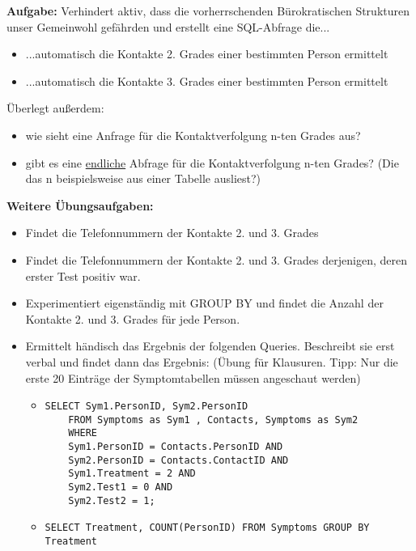 \documentclass[]{article}
\begin{document}
\textbf{Aufgabe:} Verhindert aktiv, dass die vorherrschenden Bürokratischen Strukturen unser Gemeinwohl gefährden und erstellt eine SQL-Abfrage die...
\begin{itemize}
	\item ...automatisch die Kontakte 2. Grades einer bestimmten Person ermittelt
	\item ...automatisch die Kontakte 3. Grades einer bestimmten Person ermittelt
\end{itemize}
Überlegt außerdem:
\begin{itemize}
	\item wie sieht eine Anfrage für die Kontaktverfolgung n-ten Grades aus?
	\item gibt es eine \underline{endliche} Abfrage für die Kontaktverfolgung n-ten Grades? (Die das n beispielsweise aus einer Tabelle ausliest?)
\end{itemize}

\textbf{Weitere Übungsaufgaben:}
\begin{itemize}
	\item Findet die Telefonnummern der Kontakte 2. und 3. Grades
	\item Findet die Telefonnummern der Kontakte 2. und 3. Grades derjenigen, deren erster Test positiv war. 
	\item Experimentiert eigenständig mit GROUP BY und findet die Anzahl der Kontakte 2. und 3. Grades für jede Person.
	\item Ermittelt händisch das Ergebnis der folgenden Queries. Beschreibt sie erst verbal und findet dann das Ergebnis: (Übung für Klausuren. Tipp: Nur die erste 20 Einträge der Symptomtabellen müssen angeschaut werden) \\
	\begin{itemize}\newpage
	\item  \begin{verbatim}
SELECT Sym1.PersonID, Sym2.PersonID 
	FROM Symptoms as Sym1 , Contacts, Symptoms as Sym2 
    WHERE 
    Sym1.PersonID = Contacts.PersonID AND
    Sym2.PersonID = Contacts.ContactID AND
    Sym1.Treatment = 2 AND
    Sym2.Test1 = 0 AND
    Sym2.Test2 = 1;		
		\end{verbatim}
	\item \begin{verbatim}
SELECT Treatment, COUNT(PersonID) FROM Symptoms GROUP BY Treatment
	\end{verbatim}
	\end{itemize}
\end{itemize}
\end{document}
